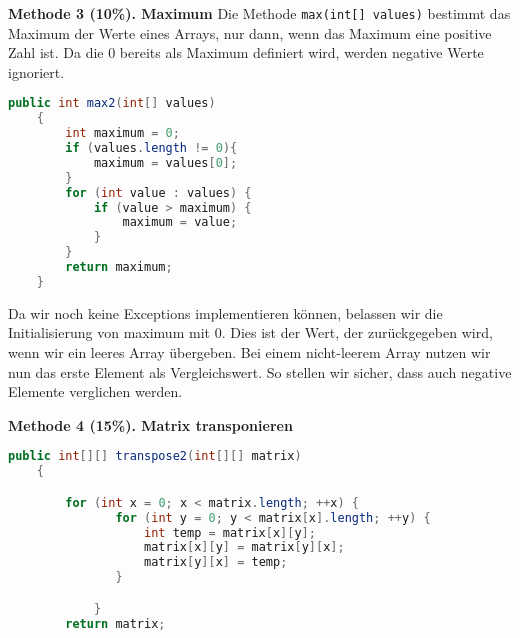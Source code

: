 \documentclass{pi1}
\begin{document}
\textbf{Methode 3 (10\%). Maximum}
Die Methode \texttt{max(int[] values)} bestimmt das Maximum der Werte eines Arrays, nur dann, wenn das Maximum eine positive Zahl ist. Da die 0 bereits als Maximum definiert wird, werden negative Werte ignoriert.

\begin{lstlisting}[caption={Korrigierte max() Methode}, firstnumber=81, language=Java]
public int max2(int[] values)
    {
        int maximum = 0;
        if (values.length != 0){
            maximum = values[0];
        }
        for (int value : values) {
            if (value > maximum) {
                maximum = value;
            }
        }
        return maximum;
    }
\end{lstlisting}

Da wir noch keine Exceptions implementieren können, belassen wir die Initialisierung von maximum mit 0. Dies ist der Wert, der zurückgegeben wird, wenn wir ein leeres Array übergeben. Bei einem nicht-leerem Array nutzen wir nun das erste Element als Vergleichswert. So stellen wir sicher, dass auch negative Elemente verglichen werden.

\textbf{Methode 4 (15\%). Matrix transponieren}

\begin{lstlisting}[firstnumber=98, language=Java]
public int[][] transpose2(int[][] matrix)
    {

        for (int x = 0; x < matrix.length; ++x) {
               for (int y = 0; y < matrix[x].length; ++y) {
                   int temp = matrix[x][y]; 
                   matrix[x][y] = matrix[y][x]; 
                   matrix[y][x] = temp;          
               } 

            }    
        return matrix;
\end{lstlisting}        
        
\end{document}

